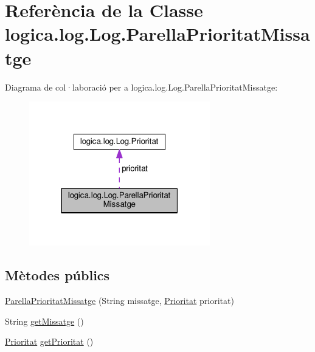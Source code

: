 \hypertarget{classlogica_1_1log_1_1_log_1_1_parella_prioritat_missatge}{\section{Referència de la Classe logica.\+log.\+Log.\+Parella\+Prioritat\+Missatge}
\label{classlogica_1_1log_1_1_log_1_1_parella_prioritat_missatge}
}


Diagrama de col·laboració per a logica.\+log.\+Log.\+Parella\+Prioritat\+Missatge\+:
\nopagebreak
\begin{figure}[H]
\begin{center}
\leavevmode
\includegraphics[width=223pt]{classlogica_1_1log_1_1_log_1_1_parella_prioritat_missatge__coll__graph}
\end{center}
\end{figure}
\subsection*{Mètodes públics}
\begin{DoxyCompactItemize}
\item 
\hyperlink{classlogica_1_1log_1_1_log_1_1_parella_prioritat_missatge_adf8c6ad8f5e8c58c17f791abf39303b4}{Parella\+Prioritat\+Missatge} (String missatge, \hyperlink{enumlogica_1_1log_1_1_log_1_1_prioritat}{Prioritat} prioritat)
\item 
String \hyperlink{classlogica_1_1log_1_1_log_1_1_parella_prioritat_missatge_a7756b4291f85d7041a0ec345b219d8dd}{get\+Missatge} ()
\item 
\hyperlink{enumlogica_1_1log_1_1_log_1_1_prioritat}{Prioritat} \hyperlink{classlogica_1_1log_1_1_log_1_1_parella_prioritat_missatge_a4610e88dadbf2838b77f65b128bd7958}{get\+Prioritat} ()
\end{DoxyCompactItemize}
